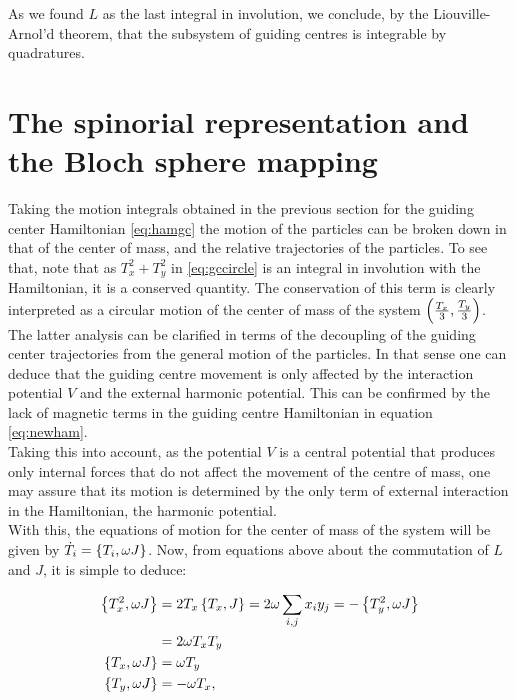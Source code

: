 As we found $L$ as the last integral in involution, we conclude, by the Liouville-Arnol'd theorem, that the subsystem of guiding centres is integrable by quadratures.\\

\section{The spinorial representation and the Bloch sphere mapping}
Taking the motion integrals obtained in the previous section for the guiding center Hamiltonian \eqref{eq:hamgc} the motion of the particles can be broken down in that of the center of mass, and the relative trajectories of the particles. To see that, note that as $T_x^2 + T_y^2$ in \eqref{eq:gccircle} is an integral in involution with the Hamiltonian, it is a conserved quantity. The conservation of this term is clearly interpreted as a circular motion of the center of mass of the system $\left( \frac{T_x}{3},\frac{T_y}{3} \right)$.\\

The latter analysis can be clarified in terms of the decoupling of the guiding center trajectories from the general motion of the particles. In that sense one can deduce that the guiding centre movement is only affected by the interaction potential $V$ and the external harmonic potential. This can be confirmed by the lack of magnetic terms in the guiding centre Hamiltonian in equation \eqref{eq:newham}.\\

Taking this into account, as the potential $V$ is a central potential that produces only internal forces that do not affect the movement of the centre of mass, one may assure that its motion is determined by the only term of external interaction in the Hamiltonian, the harmonic potential.\\

With this, the equations of motion for the center of mass of the system will be given by $\dot{T}_i = \left\lbrace T_i, {\omega}J \right\rbrace$. Now, from equations above about the commutation of $L$ and $J$, it is simple to deduce:

\begin{align*}
\left\lbrace T_x^2, \omega J \right\rbrace &= 2T_x\left\lbrace T_x, J \right\rbrace = 2\omega\sum_{i,j}x_iy_j = -\left\lbrace T_y^2, \omega J \right\rbrace\\
&= 2\omega T_xT_y \\
\left\lbrace T_x, \omega J \right\rbrace &= \omega T_y\\
\left\lbrace T_y, \omega J \right\rbrace &= -\omega T_x,
\end{align*}

